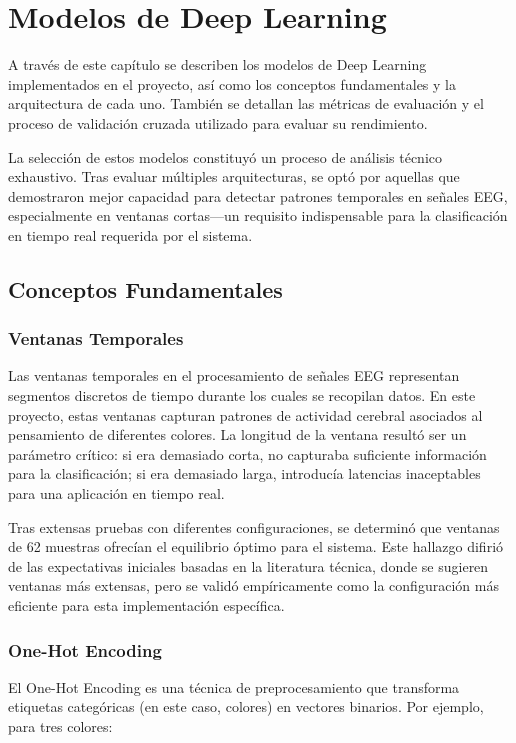\chapter{Modelos de Deep Learning}\label{ch:deep_learning_models}

A través de este capítulo se describen los modelos de Deep Learning \cite{raschka2022machine} implementados en el proyecto, así como los conceptos fundamentales y la arquitectura de cada uno. También se detallan las métricas de evaluación y el proceso de validación cruzada utilizado para evaluar su rendimiento.

La selección de estos modelos constituyó un proceso de análisis técnico exhaustivo. Tras evaluar múltiples arquitecturas, se optó por aquellas que demostraron mejor capacidad para detectar patrones temporales en señales EEG, especialmente en ventanas cortas—un requisito indispensable para la clasificación en tiempo real requerida por el sistema.

\section{Conceptos Fundamentales}

\subsection{Ventanas Temporales}
Las ventanas temporales en el procesamiento de señales EEG representan segmentos discretos de tiempo durante los cuales se recopilan datos. En este proyecto, estas ventanas capturan patrones de actividad cerebral asociados al pensamiento de diferentes colores. La longitud de la ventana resultó ser un parámetro crítico: si era demasiado corta, no capturaba suficiente información para la clasificación; si era demasiado larga, introducía latencias inaceptables para una aplicación en tiempo real.

Tras extensas pruebas con diferentes configuraciones, se determinó que ventanas de 62 muestras ofrecían el equilibrio óptimo para el sistema. Este hallazgo difirió de las expectativas iniciales basadas en la literatura técnica, donde se sugieren ventanas más extensas, pero se validó empíricamente como la configuración más eficiente para esta implementación específica.

\subsection{One-Hot Encoding}
El One-Hot Encoding \cite{raschka2022machine} es una técnica de preprocesamiento que transforma etiquetas categóricas (en este caso, colores) en vectores binarios. Por ejemplo, para tres colores:

